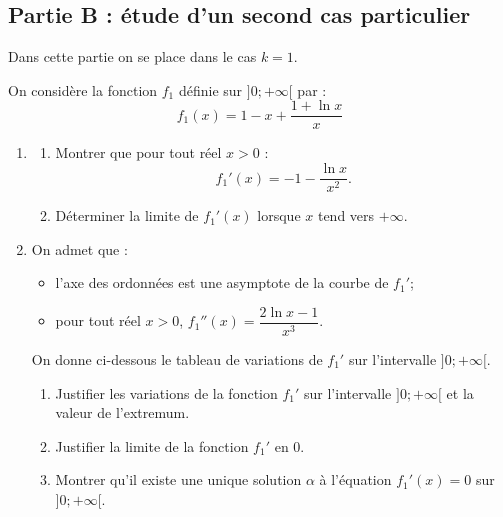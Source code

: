 	\subsection*{Partie B : étude d'un second cas particulier}
		Dans cette partie on se place dans le cas $k=1$.

		\medskip

		On considère la fonction $f_{1}$ définie sur $] 0 ;+\infty[$ par :
		\[f_{1}(x)=1-x+\dfrac{1+\ln x}{x}\]

		\begin{enumerate}
			\item \begin{enumerate}
				\item Montrer que pour tout réel $x>0$ :
				\[f_{1}'(x)=-1-\dfrac{\ln x}{x^{2}}.\]

				\item Déterminer la limite de $f_{1}'(x)$ lorsque $x$ tend vers $+\infty$.
			\end{enumerate}

			\item On admet que :
			\begin{itemize}[leftmargin=1cm]
				\item l'axe des ordonnées est une asymptote de la courbe de $f_{1}'$;
				\item pour tout réel $x>0$, \quad $f_{1}''(x)=\dfrac{2 \ln x-1}{x^{3}}$.
			\end{itemize}

			On donne ci-dessous le tableau de variations de $f_{1}'$ sur l'intervalle $] 0 ;+\infty[$.

			\begin{center}
			\end{center}

			\begin{enumerate}
				\item Justifier les variations de la fonction $f_{1}'$ sur l'intervalle $]0 ;+\infty[$ et la valeur de l'extremum.

				\item Justifier la limite de la fonction $f_{1}'$ en 0.

				\item Montrer qu'il existe une unique solution $\alpha$ à l'équation \quad $f_{1}'(x)=0$ \quad sur $] 0 ;+\infty[$.


\end{enumerate}
\end{enumerate}
